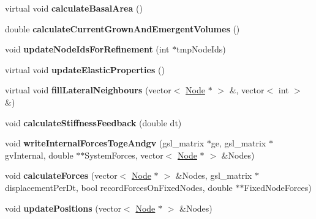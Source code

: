 \begin{DoxyCompactItemize}
\item 
\hypertarget{classShapeBase_a0bc80947335afbc181fca326e9a6b7fb}{}virtual void {\bfseries calculate\+Basal\+Area} ()\label{classShapeBase_a0bc80947335afbc181fca326e9a6b7fb}

\item 
\hypertarget{classShapeBase_a58ffd31ed76797d558b085fe754cc4b3}{}double {\bfseries calculate\+Current\+Grown\+And\+Emergent\+Volumes} ()\label{classShapeBase_a58ffd31ed76797d558b085fe754cc4b3}

\item 
\hypertarget{classShapeBase_a33c03670e18ca00ca2aa9ad1bfe0ffe5}{}void {\bfseries update\+Node\+Ids\+For\+Refinement} (int $\ast$tmp\+Node\+Ids)\label{classShapeBase_a33c03670e18ca00ca2aa9ad1bfe0ffe5}

\item 
\hypertarget{classShapeBase_a018cc92b513ff64b919c374b0767cc1b}{}virtual void {\bfseries update\+Elastic\+Properties} ()\label{classShapeBase_a018cc92b513ff64b919c374b0767cc1b}

\item 
\hypertarget{classShapeBase_ac10a19fafa895695e0d2544050690c29}{}virtual void {\bfseries fill\+Lateral\+Neighbours} (vector$<$ \hyperlink{classNode}{Node} $\ast$ $>$ \&, vector$<$ int $>$ \&)\label{classShapeBase_ac10a19fafa895695e0d2544050690c29}

\item 
\hypertarget{classShapeBase_ad6bae633124d81b12f470951e59b7ddc}{}void {\bfseries calculate\+Stiffness\+Feedback} (double dt)\label{classShapeBase_ad6bae633124d81b12f470951e59b7ddc}

\item 
\hypertarget{classShapeBase_a0f3186b2f1bfd0c1f012f4cede1074d6}{}void {\bfseries write\+Internal\+Forces\+Toge\+Andgv} (gsl\+\_\+matrix $\ast$ge, gsl\+\_\+matrix $\ast$gv\+Internal, double $\ast$$\ast$System\+Forces, vector$<$ \hyperlink{classNode}{Node} $\ast$ $>$ \&Nodes)\label{classShapeBase_a0f3186b2f1bfd0c1f012f4cede1074d6}

\item 
\hypertarget{classShapeBase_a5a30dc6b5a4ea35986b5f1f7d9b390a8}{}void {\bfseries calculate\+Forces} (vector$<$ \hyperlink{classNode}{Node} $\ast$ $>$ \&Nodes, gsl\+\_\+matrix $\ast$displacement\+Per\+Dt, bool record\+Forces\+On\+Fixed\+Nodes, double $\ast$$\ast$Fixed\+Node\+Forces)\label{classShapeBase_a5a30dc6b5a4ea35986b5f1f7d9b390a8}

\item 
\hypertarget{classShapeBase_a990c3d93836d53687b8af49a489dbde4}{}void {\bfseries update\+Positions} (vector$<$ \hyperlink{classNode}{Node} $\ast$ $>$ \&Nodes)\label{classShapeBase_a990c3d93836d53687b8af49a489dbde4}


\end{DoxyCompactItemize}
